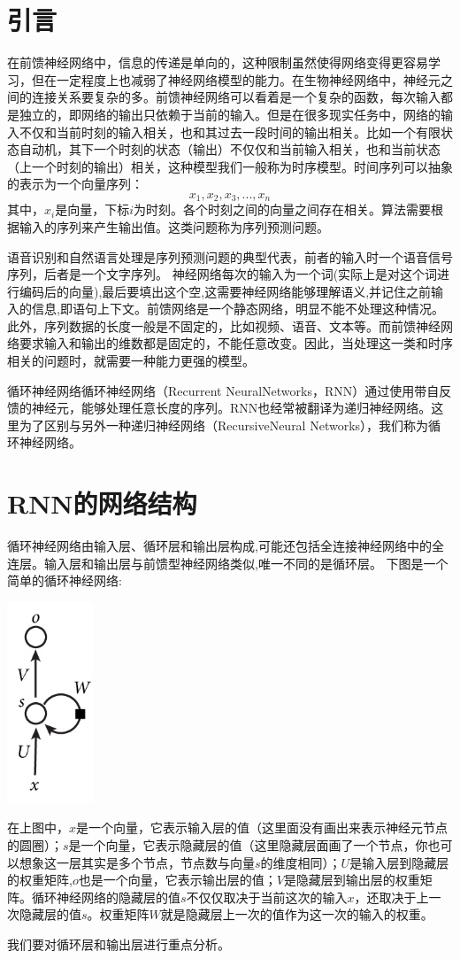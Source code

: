 \documentclass{article}
\begin{document}
\thispagestyle{empty}
\newpage
\setcounter{page}{1}
\section{引言}
在前馈神经网络中，信息的传递是单向的，这种限制虽然使得网络变得更容易学习，但在一定程度上也减弱了神经网络模型的能力。在生物神经网络中，神经元之间的连接关系要复杂的多。前馈神经网络可以看着是一个复杂的函数，每次输入都是独立的，即网络的输出只依赖于当前的输入。但是在很多现实任务中，网络的输入不仅和当前时刻的输入相关，也和其过去一段时间的输出相关。比如一个有限状态自动机，其下一个时刻的状态（输出）不仅仅和当前输入相关，也和当前状态（上一个时刻的输出）相关，这种模型我们一般称为时序模型。时间序列可以抽象的表示为一个向量序列：
$$x_1,x_2,x_3,...,x_n$$
其中，$x_i$是向量，下标$i$为时刻。各个时刻之间的向量之间存在相关。算法需要根据输入的序列来产生输出值。这类问题称为序列预测问题。
\par 
语音识别和自然语言处理是序列预测问题的典型代表，前者的输入时一个语音信号序列，后者是一个文字序列。
神经网络每次的输入为一个词(实际上是对这个词进行编码后的向量),最后要填出这个空,这需要神经网络能够理解语义,并记住之前输入的信息,即语句上下文。前馈网络是一个静态网络，明显不能不处理这种情况。此外，序列数据的长度一般是不固定的，比如视频、语音、文本等。而前馈神经网络要求输入和输出的维数都是固定的，不能任意改变。因此，当处理这一类和时序相关的问题时，就需要一种能力更强的模型。\par 
循环神经网络循环神经网络（Recurrent NeuralNetworks，RNN）通过使用带自反馈的神经元，能够处理任意长度的序列。RNN也经常被翻译为递归神经网络。这里为了区别与另外一种递归神经网络（RecursiveNeural Networks），我们称为循环神经网络。

\section{RNN的网络结构}
循环神经网络由输入层、循环层和输出层构成,可能还包括全连接神经网络中的全连层。输入层和输出层与前馈型神经网络类似,唯一不同的是循环层。
下图是一个简单的循环神经网络:\par 
\centerline{\includegraphics[height=6cm]{0}}
在上图中，$x$是一个向量，它表示输入层的值（这里面没有画出来表示神经元节点的圆圈）；$s$是一个向量，它表示隐藏层的值（这里隐藏层面画了一个节点，你也可以想象这一层其实是多个节点，节点数与向量$s$的维度相同）；$U$是输入层到隐藏层的权重矩阵,$o$也是一个向量，它表示输出层的值；$V$是隐藏层到输出层的权重矩阵。循环神经网络的隐藏层的值$s$不仅仅取决于当前这次的输入$x$，还取决于上一次隐藏层的值$s$。权重矩阵$W$就是隐藏层上一次的值作为这一次的输入的权重。
\par 
我们要对循环层和输出层进行重点分析。
\end{document}
